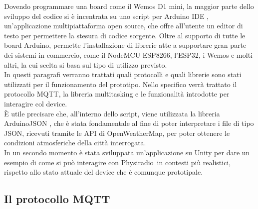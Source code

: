 \documentclass[12pt,a4paper]{report}
\newcommand{\physiradio}{Physiradio} %
\begin{document}
Dovendo programmare una board come il Wemos D1 mini, la maggior parte dello sviluppo del codice si è incentrata su uno script per Arduino IDE \cite{arduino}, un'applicazione multipiattaforma open source, che offre all'utente un editor di testo per permettere la stesura di codice sorgente. Oltre al supporto di tutte le board Arduino, permette l'installazione di librerie atte a supportare gran parte dei sistemi in commercio, come il NodeMCU ESP8266, l'ESP32, i Wemos e molti altri, la cui scelta si basa sul tipo di utilizzo previsto.\\
In questi paragrafi verranno trattati quali protocolli e quali librerie sono stati utilizzati per il funzionamento del prototipo. Nello specifico verrà trattato il protocollo MQTT, la libreria multitasking e le funzionalità introdotte per interagire col device.\\
È utile precisare che, all'interno dello script, viene utilizzata la libreria ArduinoJSON \cite{arduinoJSON}, che è stata fondamentale al fine di poter interpretare i file di tipo JSON, ricevuti tramite le API di OpenWeatherMap, per poter ottenere le condizioni atmosferiche della città interrogata.\\


In un secondo momento è stata sviluppata un'applicazione su Unity\cite{unity} per dare un esempio di come si può interagire con \physiradio\ in contesti più realistici, rispetto allo stato attuale del device che è comunque prototipale.




\subsection{Il protocollo MQTT} \label{sec:mqttProtocol}
\end{document}
